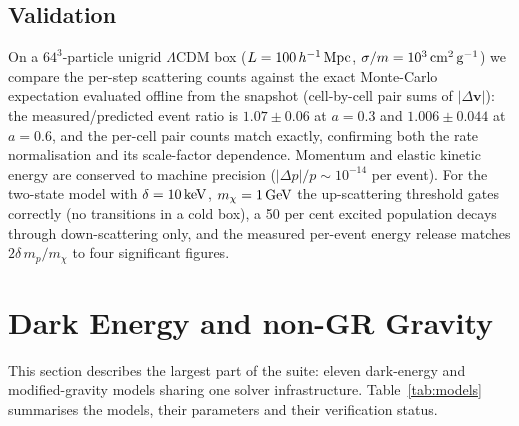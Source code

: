 \documentclass[11pt,a4paper]{article}
\begin{document}
\subsection{Validation}

On a $64^3$-particle unigrid $\Lambda$CDM box
($L=100\,h^{-1}\,{\rm Mpc}$, $\sigma/m=10^3\,{\rm cm^2\,g^{-1}}$)
we compare the per-step scattering counts against the exact
Monte-Carlo expectation evaluated offline from the snapshot
(cell-by-cell pair sums of $|\Delta\boldsymbol{v}|$): the measured/predicted
event ratio is $1.07\pm0.06$ at $a=0.3$ and $1.006\pm0.044$ at
$a=0.6$, and the per-cell pair counts match exactly, confirming
both the rate normalisation and its scale-factor dependence.
Momentum and elastic kinetic energy are conserved to machine
precision ($|\Delta p|/p\sim10^{-14}$ per event). For the
two-state model with $\delta=10\,{\rm keV}$, $m_\chi=1\,{\rm GeV}$
the up-scattering threshold gates correctly (no transitions in a
cold box), a 50 per cent excited population decays through
down-scattering only, and the measured per-event energy release
matches $2\delta\,m_p/m_\chi$ to four significant figures.

\section{Dark Energy and non-GR Gravity}
\label{sec:denongr}

This section describes the largest part of the suite: eleven
dark-energy and modified-gravity models sharing one solver
infrastructure. Table~\ref{tab:models} summarises the models,
their parameters and their verification status.
\end{document}
